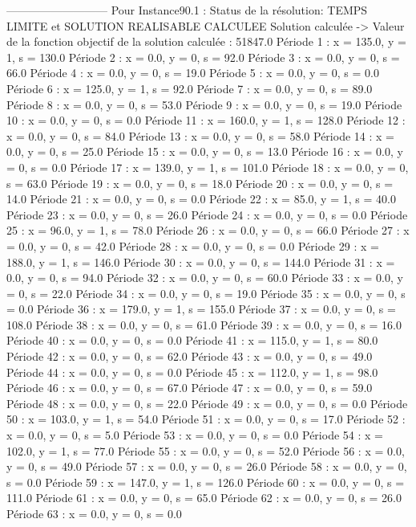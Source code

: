---------------------------
Pour Instance90.1  :
Status de la résolution: TEMPS LIMITE et SOLUTION REALISABLE CALCULEE
Solution calculée
-> Valeur de la fonction objectif de la solution calculée :  51847.0
Période 1 : x = 135.0, y = 1, s = 130.0
Période 2 : x = 0.0, y = 0, s = 92.0
Période 3 : x = 0.0, y = 0, s = 66.0
Période 4 : x = 0.0, y = 0, s = 19.0
Période 5 : x = 0.0, y = 0, s = 0.0
Période 6 : x = 125.0, y = 1, s = 92.0
Période 7 : x = 0.0, y = 0, s = 89.0
Période 8 : x = 0.0, y = 0, s = 53.0
Période 9 : x = 0.0, y = 0, s = 19.0
Période 10 : x = 0.0, y = 0, s = 0.0
Période 11 : x = 160.0, y = 1, s = 128.0
Période 12 : x = 0.0, y = 0, s = 84.0
Période 13 : x = 0.0, y = 0, s = 58.0
Période 14 : x = 0.0, y = 0, s = 25.0
Période 15 : x = 0.0, y = 0, s = 13.0
Période 16 : x = 0.0, y = 0, s = 0.0
Période 17 : x = 139.0, y = 1, s = 101.0
Période 18 : x = 0.0, y = 0, s = 63.0
Période 19 : x = 0.0, y = 0, s = 18.0
Période 20 : x = 0.0, y = 0, s = 14.0
Période 21 : x = 0.0, y = 0, s = 0.0
Période 22 : x = 85.0, y = 1, s = 40.0
Période 23 : x = 0.0, y = 0, s = 26.0
Période 24 : x = 0.0, y = 0, s = 0.0
Période 25 : x = 96.0, y = 1, s = 78.0
Période 26 : x = 0.0, y = 0, s = 66.0
Période 27 : x = 0.0, y = 0, s = 42.0
Période 28 : x = 0.0, y = 0, s = 0.0
Période 29 : x = 188.0, y = 1, s = 146.0
Période 30 : x = 0.0, y = 0, s = 144.0
Période 31 : x = 0.0, y = 0, s = 94.0
Période 32 : x = 0.0, y = 0, s = 60.0
Période 33 : x = 0.0, y = 0, s = 22.0
Période 34 : x = 0.0, y = 0, s = 19.0
Période 35 : x = 0.0, y = 0, s = 0.0
Période 36 : x = 179.0, y = 1, s = 155.0
Période 37 : x = 0.0, y = 0, s = 108.0
Période 38 : x = 0.0, y = 0, s = 61.0
Période 39 : x = 0.0, y = 0, s = 16.0
Période 40 : x = 0.0, y = 0, s = 0.0
Période 41 : x = 115.0, y = 1, s = 80.0
Période 42 : x = 0.0, y = 0, s = 62.0
Période 43 : x = 0.0, y = 0, s = 49.0
Période 44 : x = 0.0, y = 0, s = 0.0
Période 45 : x = 112.0, y = 1, s = 98.0
Période 46 : x = 0.0, y = 0, s = 67.0
Période 47 : x = 0.0, y = 0, s = 59.0
Période 48 : x = 0.0, y = 0, s = 22.0
Période 49 : x = 0.0, y = 0, s = 0.0
Période 50 : x = 103.0, y = 1, s = 54.0
Période 51 : x = 0.0, y = 0, s = 17.0
Période 52 : x = 0.0, y = 0, s = 5.0
Période 53 : x = 0.0, y = 0, s = 0.0
Période 54 : x = 102.0, y = 1, s = 77.0
Période 55 : x = 0.0, y = 0, s = 52.0
Période 56 : x = 0.0, y = 0, s = 49.0
Période 57 : x = 0.0, y = 0, s = 26.0
Période 58 : x = 0.0, y = 0, s = 0.0
Période 59 : x = 147.0, y = 1, s = 126.0
Période 60 : x = 0.0, y = 0, s = 111.0
Période 61 : x = 0.0, y = 0, s = 65.0
Période 62 : x = 0.0, y = 0, s = 26.0
Période 63 : x = 0.0, y = 0, s = 0.0
